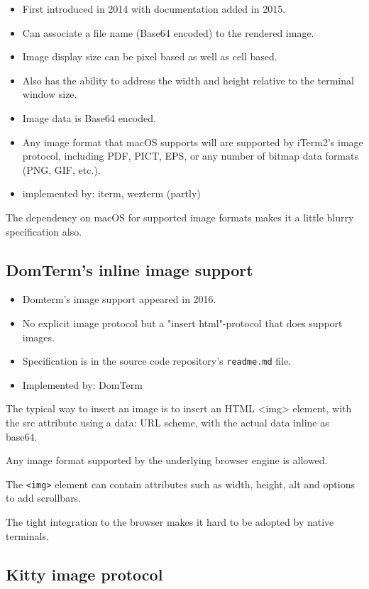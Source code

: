 \documentclass[a4paper]{article}
\begin{document}
\begin{itemize}
    \item First introduced in 2014 with documentation added in 2015.
    \item Can associate a file name (Base64 encoded) to the rendered image.
    \item Image display size can be pixel based as well as cell based.
    \item Also has the ability to address the width and height relative to the terminal window size.
    \item Image data is Base64 encoded.
    \item Any image format that macOS supports will are supported by iTerm2's image protocol,
        including PDF, PICT, EPS, or any number of bitmap data formats (PNG, GIF, etc.).
    \item implemented by: iterm, wezterm (partly)
\end{itemize}

The dependency on macOS for supported image formats makes it a little blurry
specification also.

\subsection{DomTerm's inline image support}

\begin{itemize}
    \item Domterm's image support appeared in 2016.
    \item No explicit image protocol but a "insert html"-protocol that does support images.
    \item Specification is in the source code repository's \texttt{readme.md} file.
    \item Implemented by: DomTerm
\end{itemize}

The typical way to insert an image is to insert an HTML <img> element,
with the src attribute using a data: URL scheme,
with the actual data inline as base64.

Any image format supported by the underlying browser engine is allowed.

The \texttt{<img>} element can contain attributes such as width, height, alt
and options to add scrollbars.

The tight integration to the browser makes it hard to be adopted by native
terminals.

\subsection{Kitty image protocol}
\end{document}
